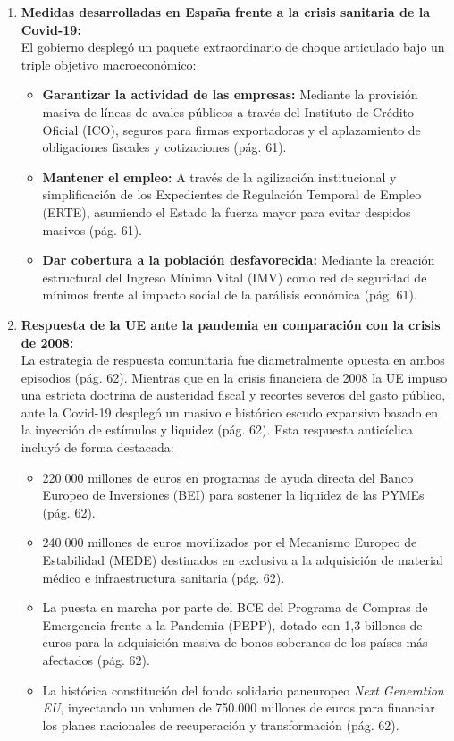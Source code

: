 \begin{enumerate}[label=\arabic*.]
    \item \textbf{Medidas desarrolladas en España frente a la crisis sanitaria de la Covid-19:} \\
    El gobierno desplegó un paquete extraordinario de choque articulado bajo un triple objetivo macroeconómico:
    \begin{itemize}
        \item \textbf{Garantizar la actividad de las empresas:} Mediante la provisión masiva de líneas de avales públicos a través del Instituto de Crédito Oficial (ICO), seguros para firmas exportadoras y el aplazamiento de obligaciones fiscales y cotizaciones (pág. 61).
        \item \textbf{Mantener el empleo:} A través de la agilización institucional y simplificación de los Expedientes de Regulación Temporal de Empleo (ERTE), asumiendo el Estado la fuerza mayor para evitar despidos masivos (pág. 61).
        \item \textbf{Dar cobertura a la población desfavorecida:} Mediante la creación estructural del Ingreso Mínimo Vital (IMV) como red de seguridad de mínimos frente al impacto social de la parálisis económica (pág. 61).
    \end{itemize}

    \item \textbf{Respuesta de la UE ante la pandemia en comparación con la crisis de 2008:} \\
    La estrategia de respuesta comunitaria fue diametralmente opuesta en ambos episodios (pág. 62). Mientras que en la crisis financiera de 2008 la UE impuso una estricta doctrina de austeridad fiscal y recortes severos del gasto público, ante la Covid-19 desplegó un masivo e histórico escudo expansivo basado en la inyección de estímulos y liquidez (pág. 62). Esta respuesta anticíclica incluyó de forma destacada:
    \begin{itemize}
        \item 220.000 millones de euros en programas de ayuda directa del Banco Europeo de Inversiones (BEI) para sostener la liquidez de las PYMEs (pág. 62).
        \item 240.000 millones de euros movilizados por el Mecanismo Europeo de Estabilidad (MEDE) destinados en exclusiva a la adquisición de material médico e infraestructura sanitaria (pág. 62).
        \item La puesta en marcha por parte del BCE del Programa de Compras de Emergencia frente a la Pandemia (PEPP), dotado con 1,3 billones de euros para la adquisición masiva de bonos soberanos de los países más afectados (pág. 62).
        \item La histórica constitución del fondo solidario paneuropeo \textit{Next Generation EU}, inyectando un volumen de 750.000 millones de euros para financiar los planes nacionales de recuperación y transformación (pág. 62).
    \end{itemize}

\end{enumerate}
